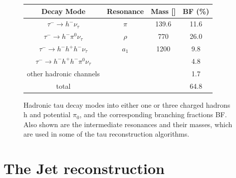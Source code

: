 \begin{figure}[tbh!]
	\begin{center}	
			\begin{tabular}{ | c | c | c | c |}
				\hline
				Decay Mode & Resonance & Mass [\mev] & BF (\%) \\ \hline
				\hline
				$\tau^{-}\longrightarrow h^{-}\nu_{\tau}$& $\pi$ & 139.6 & 11.6 \\ \hline
				$\tau^{-}\longrightarrow h^{-}\pi^{0}\nu_{\tau}$& $\rho$ & 770 & 26.0 \\ \hline
				$\tau^{-}\longrightarrow h^{-} h^{+} h^{-} \nu_{\tau}$& $a_{1}$& 1200 & 9.8 \\ \hline
				$\tau^{-}\longrightarrow h^{-} h^{+} h^{-} \pi^{0}\nu_{\tau}$& & & 4.8 \\ \hline
				other hadronic channels& & & 1.7 \\ \hline
				\hline
				total & & & 64.8 \\ \hline
				\hline
			\end{tabular}
		\caption{ Hadronic tau decay modes into either one or three charged hadrons h and potential $\pi_{0}$, and the corresponding branching fractions BF. Also shown are the intermediate resonances and their masses, which are used in some of the tau reconstruction algorithms.}
		\label{table:tau_hdecay}
	\end{center}
\end{figure}

\section {The Jet reconstruction}

